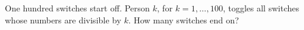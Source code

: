 One hundred switches start off. Person $k$, for $k=1,\ldots,100$, toggles all switches whose numbers are divisible by $k$. How many switches end on?
